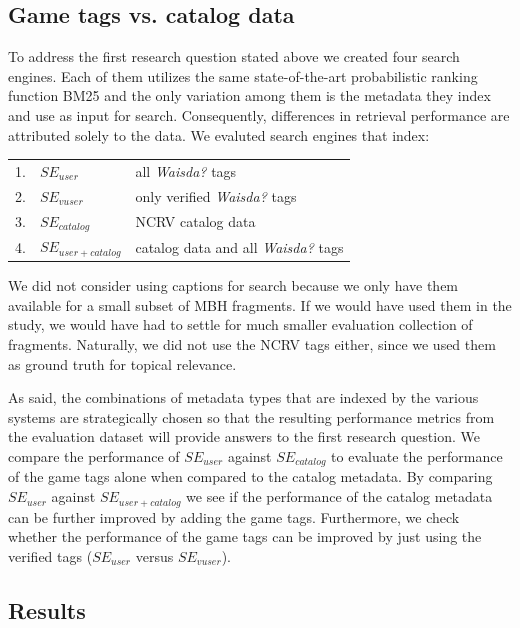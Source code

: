 \subsection{Game tags vs. catalog data}\label{filter:sec:ses}
To address the first research question stated above we created four search engines. Each of them utilizes the same state-of-the-art probabilistic ranking function BM25 and the only variation among them is the metadata they index and use as input for search. Consequently, differences in retrieval performance are attributed solely to the data. We evaluted search engines that index:

\begin{tabular}{lll}
 1. & $SE_{user}$  & all \textit{Waisda?} tags \\
 2. & $SE_{vuser}$& only verified \textit{Waisda?} tags \\
 3. & $SE_{catalog}$&  NCRV catalog data \\
 4. & $SE_{user+catalog}$&  catalog data and all \textit{Waisda?}  tags \\
\end{tabular}

We did not consider using captions for search because we only have them available for a small subset of MBH fragments. If we would have used them in the study, we would have had to settle for much smaller evaluation collection of fragments. Naturally, we did not use the NCRV tags either, since we used them as ground truth for topical relevance.

As said, the combinations of metadata types that are indexed by the various systems are strategically chosen so that the resulting performance metrics from the evaluation dataset will provide answers to the first research question. We compare the performance of $SE_{user}$ against $SE_{catalog}$ to evaluate the performance of the game tags alone when compared to the catalog metadata. By comparing $SE_{user}$ against $SE_{user+catalog}$ we see if the performance of the catalog metadata can be further improved by adding the game tags. Furthermore, we check whether the performance of the game tags can be improved by just using the verified tags ($SE_{user}$ versus $SE_{vuser}$).

\subsection{Results}\label{sec:topicir:results}

